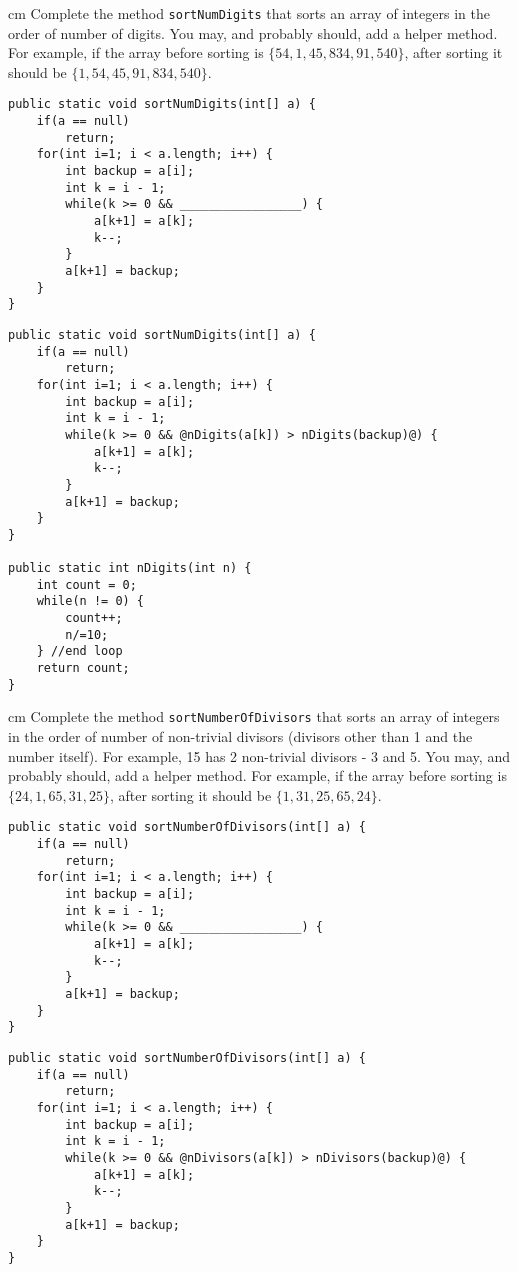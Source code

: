 \begin{questions}
 cm \question  Complete the method \texttt{sortNumDigits} that sorts an array of integers in the order of number of digits. You may, and probably should, add a helper method. For example, if the array before sorting is $\{54, 1, 45, 834, 91, 540\}$, after sorting it should be $\{1, 54, 45, 91, 834, 540\}$.

\begin{lstlisting}
public static void sortNumDigits(int[] a) {
	if(a == null) 
		return;
	for(int i=1; i < a.length; i++) {
		int backup = a[i];
		int k = i - 1;
		while(k >= 0 && _________________) {
			a[k+1] = a[k];
			k--;
		}
		a[k+1] = backup;
	}
}	
\end{lstlisting}

\begin{solution}
\begin{lstlisting}
public static void sortNumDigits(int[] a) {
	if(a == null) 
		return;
	for(int i=1; i < a.length; i++) {
		int backup = a[i];
		int k = i - 1;
		while(k >= 0 && @nDigits(a[k]) > nDigits(backup)@) {
			a[k+1] = a[k];
			k--;
		}
		a[k+1] = backup;
	}
}

public static int nDigits(int n) {
	int count = 0;
	while(n != 0) {
		count++;
		n/=10;
	} //end loop
	return count;
}	
\end{lstlisting}
\end{solution}

 cm \question  Complete the method \texttt{sortNumberOfDivisors} that sorts an array of integers in the order of number of non-trivial divisors (divisors other than 1 and the number itself). For example, 15 has 2 non-trivial divisors - 3 and 5. You may, and probably should, add a helper method. For example, if the array before sorting is $\{24, 1, 65, 31, 25\}$, after sorting it should be $\{1, 31, 25, 65, 24\}$.

\begin{lstlisting}
public static void sortNumberOfDivisors(int[] a) {
	if(a == null) 
		return;
	for(int i=1; i < a.length; i++) {
		int backup = a[i];
		int k = i - 1;
		while(k >= 0 && _________________) {
			a[k+1] = a[k];
			k--;
		}
		a[k+1] = backup;
	}
}	
\end{lstlisting}

\begin{solution}
\begin{lstlisting}[style=buggy]
public static void sortNumberOfDivisors(int[] a) {
	if(a == null) 
		return;
	for(int i=1; i < a.length; i++) {
		int backup = a[i];
		int k = i - 1;
		while(k >= 0 && @nDivisors(a[k]) > nDivisors(backup)@) {
			a[k+1] = a[k];
			k--;
		}
		a[k+1] = backup;
	}
}


\end{lstlisting}
\end{solution}
\end{questions}
